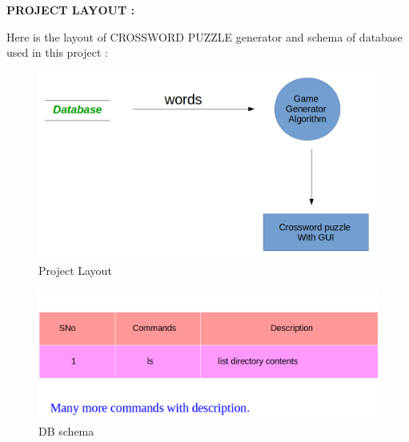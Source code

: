 \textbf{PROJECT LAYOUT :}


Here is the layout of CROSSWORD PUZZLE generator and schema of database used in this project :\\
\begin{figure}[!ht]
\centering
\includegraphics[scale=0.4]{layout.png}
\caption{\label{img} Project Layout}
\end{figure}


\begin{figure}[!ht]
\centering
\includegraphics[scale=0.4]{db.png}
\caption{\label{img} DB schema}
\end{figure}




